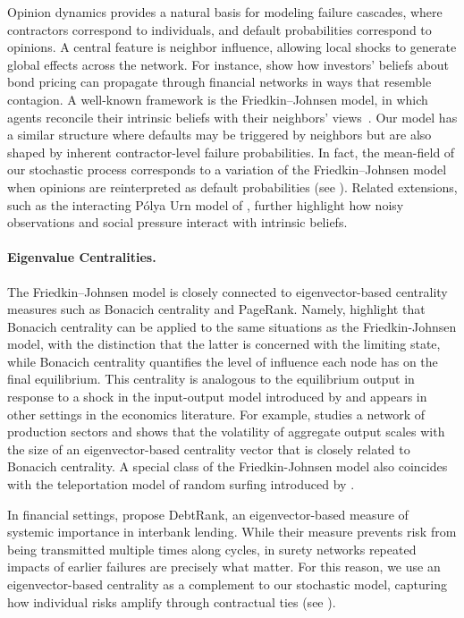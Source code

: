 \documentclass[mnsc,nonblindrev]{informs3}
\begin{document}
Opinion dynamics provides a natural basis for modeling failure cascades, where contractors correspond to individuals, and default probabilities correspond to opinions. A central feature is neighbor influence, allowing local shocks to generate global effects across the network. For instance, \citet{benzoni2015modeling} show how investors’ beliefs about bond pricing can propagate through financial networks in ways that resemble contagion.  A well-known framework is the Friedkin–Johnsen model, in which agents reconcile their intrinsic beliefs with their neighbors’ views~\citep{FriedkinJohnsen}. Our model has a similar structure where defaults may be triggered by neighbors but are also shaped by inherent contractor-level failure probabilities. In fact, the mean-field of our stochastic process corresponds to a variation of the Friedkin–Johnsen model when opinions are reinterpreted as default probabilities (see ).  Related extensions, such as the interacting Pólya Urn model of \citet{tang2024estimating}, further highlight how noisy observations and social pressure interact with intrinsic beliefs. 


\paragraph{Eigenvalue Centralities.}

The Friedkin–Johnsen model is closely connected to eigenvector-based centrality measures such as Bonacich centrality and PageRank. Namely, \citet{bonacich2001eigenvector} highlight that Bonacich centrality can be applied to the same situations as the Friedkin-Johnsen model, with the distinction that the latter is concerned with the limiting state, while Bonacich centrality quantifies the level of influence each node has on the final equilibrium.  This centrality is analogous to the equilibrium output in response to a shock in the input-output model introduced by \citet{leontief1986input} and appears in other settings in the economics literature.  For example, \citet{acemoglu2012network} studies a network of production sectors and shows that the volatility of aggregate output scales with the size of an eigenvector-based centrality vector that is closely related to Bonacich centrality.  A special class of the Friedkin-Johnsen model also coincides with the teleportation model of random surfing introduced by \citet{page1999pagerank,proskurnikov2016pagerank}.

In financial settings, \citet{battiston2012debtrank} propose DebtRank, an eigenvector-based measure of systemic importance in interbank lending. While their measure prevents risk from being transmitted multiple times along cycles, in surety networks repeated impacts of earlier failures are precisely what matter. For this reason, we use an eigenvector-based centrality as a complement to our stochastic model, capturing how individual risks amplify through contractual ties (see ).
\end{document}
